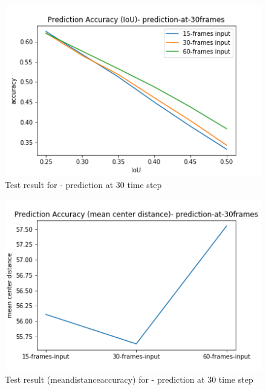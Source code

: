 \begin{figure}[H] \label{30-IoU}
\includegraphics[scale=0.8]{prediction-at-30frames_IoU}
\begin{center}
\caption{Test result for - prediction at 30 time step }
\end{center}
\end{figure}

\begin{figure}[H] \label{30-mcd}
\includegraphics[scale=0.8]{prediction-at-30frames-mean_distance_accuracy}
\begin{center}
\caption{Test result (mean\textunderscore distance\textunderscore accuracy) for - prediction at 30 time step  }
\end{center}
\end{figure}


